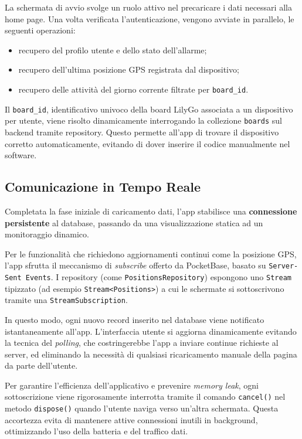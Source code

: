 \documentclass[12pt,a4paper]{article}
\begin{document}
La schermata di avvio svolge un ruolo attivo nel precaricare i dati 
necessari alla home page. Una volta verificata l'autenticazione, 
vengono avviate in parallelo, le seguenti operazioni:

\begin{itemize}
  \item recupero del profilo utente e dello stato dell'allarme;
  \item recupero dell'ultima posizione GPS registrata dal dispositivo;
  \item recupero delle attività del giorno corrente filtrate per \texttt{board\_id}.
\end{itemize}

Il \texttt{board\_id}, identificativo univoco della board LilyGo associata a un dispositivo per utente,
viene risolto dinamicamente interrogando la collezione \texttt{boards} sul backend tramite repository.
Questo permette all'app di trovare il dispositivo corretto automaticamente, 
evitando di dover inserire il codice manualmente nel software.


\subsection{Comunicazione in Tempo Reale}

Completata la fase iniziale di caricamento dati, l'app stabilisce una 
\textbf{connessione persistente} al database, passando da una visualizzazione 
statica ad un monitoraggio dinamico.

Per le funzionalità che richiedono aggiornamenti continui come la posizione GPS, 
l'app sfrutta il meccanismo di \textit{subscribe} offerto da PocketBase, 
basato su \texttt{Server-Sent Events}. 
I repository (come \texttt{PositionsRepository}) espongono uno \texttt{Stream} tipizzato 
(ad esempio \texttt{Stream<Positions>}) a cui le schermate si sottoscrivono 
tramite una \texttt{StreamSubscription}.

In questo modo, ogni nuovo record inserito nel database viene notificato 
istantaneamente all'app. L'interfaccia utente si aggiorna dinamicamente 
evitando la tecnica del \textit{polling}, che costringerebbe l'app a inviare 
continue richieste al server, ed eliminando la necessità di qualsiasi ricaricamento 
manuale della pagina da parte dell'utente.

Per garantire l'efficienza dell'applicativo e prevenire \textit{memory leak}, 
ogni sottoscrizione viene rigorosamente interrotta tramite il comando
\texttt{cancel()} nel metodo \texttt{dispose()} quando l'utente naviga verso un'altra schermata. 
Questa accortezza evita di mantenere attive connessioni inutili in background, 
ottimizzando l'uso della batteria e del traffico dati.
\end{document}
